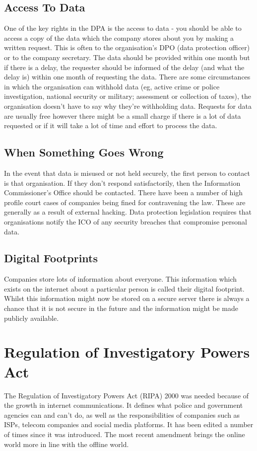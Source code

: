 \documentclass[a4paper,11pt, twocolumn]{article}
\begin{document}
\subsection{Access To Data}
One of the key rights in the DPA is the access to data - you should be able to access a copy of the data which the company stores about you by making a written request. This is often to the organisation's DPO (data protection officer) or to the company secretary. The data should be provided within one month but if there is a delay, the requester should be informed of the delay (and what the delay is) within one month of requesting the data. There are some circumstances in which the organisation can withhold data (eg, active crime or police investigation, national security or military; assessment or collection of taxes), the organisation doesn't have to say why they're withholding data. Requests for data are usually free however there might be a small charge if there is a lot of data requested or if it will take a lot of time and effort to process the data.
\subsection{When Something Goes Wrong}
In the event that data is misused or not held securely, the first person to contact is that organisation. If they don't respond satisfactorily, then the Information Commissioner's Office should be contacted. There have been a number of high profile court cases of companies being fined for contravening the law. These are generally as a result of external hacking. Data protection legislation requires that organisations notify the ICO of any security breaches that compromise personal data.
\subsection{Digital Footprints}
Companies store lots of information about everyone. This information which exists on the internet about a particular person is called their digital footprint. Whilst this information might now be stored on a secure server there is always a chance that it is not secure in the future and the information might be made publicly available.
\section{Regulation of Investigatory Powers Act}
The Regulation of Investigatory Powers Act (RIPA) 2000 was needed because of the growth in internet communications. It defines what police and government agencies can and can't do, as well as the responsibilities of companies such as ISPs, telecom companies and social media platforms. 
It has been edited a number of times since it was introduced. The most recent amendment brings the online world more in line with the offline world.
\end{document}
